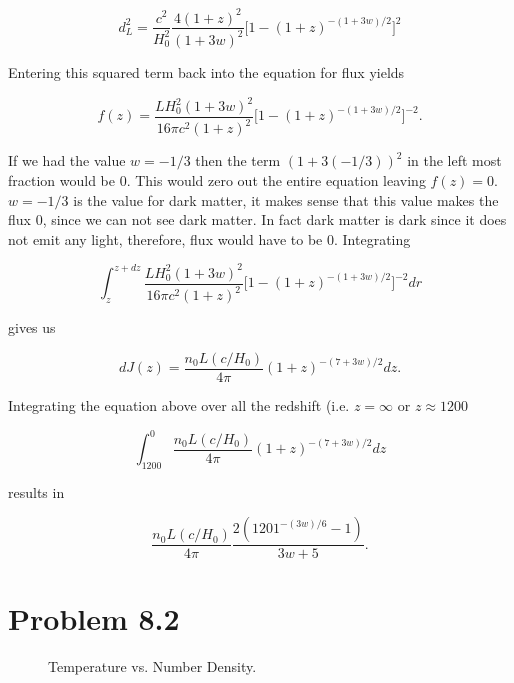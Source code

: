 \documentclass[12pt]{article}
\begin{document}
$$
d_{L}^{2} = \frac{c^{2}}{H_{0}^{2}}\frac{4(1 + z)^{2}}{(1 + 3w)^{2}}\Big[1 - (1 + z)^{-(1 + 3w)/2}\Big]^{2}
$$

Entering this squared term back into the equation for flux yields 

$$
f(z) = \frac{L H_{0}^{2}(1 + 3w)^{2}}{16\pi c^{2}(1 + z)^{2}}\Big[1 - (1 + z)^{-(1 + 3w)/2}\Big]^{-2}.
$$

If we had the value $w = -1/3$ then the term $(1 + 3(-1/3))^{2}$ in the left most fraction would be $0$. This would zero out the entire equation leaving $f(z) = 0$. $w = -1/3$ is the value for dark matter, it makes sense that this value makes the flux $0$, since we can not see dark matter. In fact dark matter is dark since it does not emit any light, therefore, flux would have to be $0$. Integrating

$$
\int_{z}^{z + dz} \frac{L H_{0}^{2}(1 + 3w)^{2}}{16\pi c^{2}(1 + z)^{2}}\Big[1 - (1 + z)^{-(1 + 3w)/2}\Big]^{-2} dr
$$

gives us 

$$
dJ(z) = \frac{n_{0}L(c/H_{0})}{4\pi}(1 + z)^{-(7 + 3w)/2}dz.
$$

Integrating the equation above over all the redshift (i.e. $z = \infty$ or $z \approx 1200$

$$
\int_{1200}^{0} \frac{n_{0}L(c/H_{0})}{4\pi}(1 + z)^{-(7 + 3w)/2}dz
$$

results in 

$$
\frac{n_{0}L(c/H_{0})}{4\pi} \frac{2(1201^{-(3w)/6}-1)}{3w + 5}.
$$

\section*{Problem 8.2}


\begin{figure}[h!]
    \centering
    \qquad
    \caption{Temperature vs. Number Density.}%
    \label{fig:example}%
\end{figure}
\end{document}
